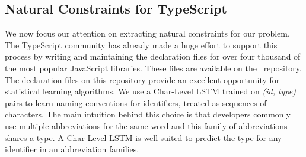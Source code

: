 \documentclass[sigplan,10pt,review,anonymous]{acmart} %
\theoremstyle{plain}
\theoremstyle{remark}
\theoremstyle{definition}
\begin{document}
\subsection{Natural Constraints for TypeScript}\label{ssec:natprodts}
We now focus our attention on extracting natural constraints for
our problem.
The TypeScript community has already
made a huge effort to support this process by writing and maintaining the
declaration files for over four thousand of the most popular JavaScript
libraries. These files are available on the~\citet{definitelytyped}
repository. The declaration files on this repository provide an excellent
opportunity for statistical learning algorithms.
We use a Char-Level LSTM trained on
\textit{(id, type)} pairs to learn naming conventions
for identifiers, treated as sequences of characters.
The main intuition behind this choice is that
developers commonly use multiple abbreviations for the same word and
this family of abbreviations shares a type.
A Char-Level LSTM is well-suited to predict the type for any identifier in
an abbreviation families.
\end{document}
